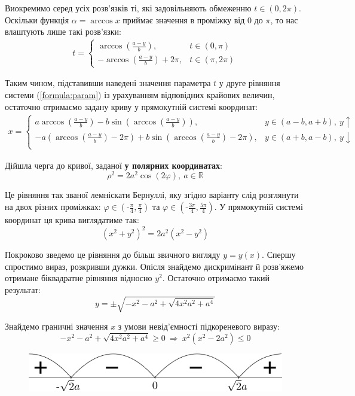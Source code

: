 \documentclass[a4paper,14pt]{extarticle} %
\begin{document}
Виокремимо серед усіх розв'язків ті, які задовільняють обмеженню $t \in (0, 2\pi)$. Оскільки функція $\alpha=\arccos x$ 
приймає значення в проміжку від $0$ до $\pi$, то нас влаштують лише такі розв'язки:
\begin{align*}
    t=
    \begin{cases}
        \arccos(\tfrac{a-y}{b}), &t \in (0, \pi) \\
        -\arccos(\tfrac{a-y}{b})+2\pi, &t \in (\pi, 2\pi)
    \end{cases}
\end{align*}

Таким чином, підставивши наведені значення параметра $t$ у друге рівняння сис\-теми (\ref{formula:param}) із 
урахуванням відповідних крайових величин, остаточно отримаємо задану криву у прямокутній системі координат: 
\begin{align*}
    x=
    \begin{cases}
        a\arccos(\tfrac{a-y}{b})-b\sin(\arccos(\tfrac{a-y}{b})), &y \in (a-b,a+b),\ y\uparrow \\
        -a(\arccos(\tfrac{a-y}{b})-2\pi)+b\sin(\arccos(\tfrac{a-y}{b})-2\pi), &y \in (a+b,a-b),\ y\downarrow \\
    \end{cases}
\end{align*}

Дійшла черга до кривої, заданої \textbf{у полярних координатах}:
\begin{equation} 
    \rho^2=2a^2\cos(2\varphi),\ a \in \mathbb{R} 
\end{equation} 

Це рівняння так званої лемніскати Бернуллі, яку згідно варіанту слід розглянути на двох різних проміжках:
$\varphi \in (\text{-}\tfrac{\pi}{4},\tfrac{\pi}{4})$ та $\varphi \in (\text{-}\tfrac{3\pi}{4}, \tfrac{5\pi}{4})$.
У прямокутній системі координат ця крива виглядатиме так:
\[ (x^2+y^2)^2=2a^2(x^2-y^2) \]

Покроково зведемо це рівняння до більш звичного вигляду $y=y(x)$. Спершу спростимо вираз, розкривши дужки. Опісля знайдемо 
дискримінант й розв'яжемо отримане біквадратне рівняння відносно $y^2$. Остаточно отримаємо такий результат:
\[ y=\pm \sqrt{-x^2-a^2+\sqrt{4x^2a^2 + a^4}} \] 

Знайдемо граничні значення $x$ з умови невід'ємності підкореневого виразу:
\[ -x^2-a^2+\sqrt{4x^2a^2 + a^4} \geqslant 0 \ \Rightarrow \ x^2(x^2-2a^2) \leqslant  0 \]

\begin{figure}
    \vspace{-0.5cm}
    \center\includegraphics[width=0.9\linewidth]{plus_minus.png}
    \label{fig:instance}
\end{figure}
\end{document}
